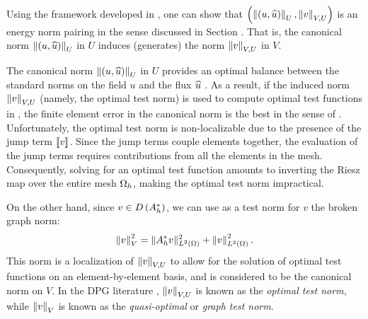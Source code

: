 
Using the framework developed in \cite{Bui-ThanhDemkowiczGhattas11a}, one can show that $\LRp{\nor{\LRp{u,\uh}}_U,  \nor{v}_{V,U}}$ is an energy norm pairing in the sense discussed in Section . That is, the canonical norm $\nor{\LRp{u,\uh}}_U$ in $U$ induces (generates) the norm $\nor{v}_{V,U}$ in $V$.  

The canonical norm $\nor{\LRp{u,\uh}}_U$ in $U$ provides an optimal balance between the standard norms on the field $u$ and the flux $\uh$ \cite{DPG4}. As a result, if the induced norm $\nor{v}_{V,U}$ (namely, the optimal test norm) is used to compute  optimal test functions in , the finite element error in the canonical norm is the best in the sense of . Unfortunately, the optimal test norm is non-localizable due to the presence of the jump term $\jump{v}$. Since the jump terms couple elements together, the evaluation of the jump terms requires contributions from all the elements in the mesh. Consequently, solving for an optimal test function amounts to inverting the Riesz map over the entire mesh $\Oh$, making the optimal test norm impractical.

On the other hand, since $v \in D\LRp{A^*_h}$, we can use as a test norm for $v$ the broken graph norm: 
\[
\nor{v}_V^2 =  \|A_h^*v\|_{\L}^2 + \nor{v}_{\L}^2.
\]
This norm is a localization of $\nor{v}_{V,U}$ to allow for the solution of optimal test functions on an element-by-element basis, and is considered to be the canonical norm on $V$.  In the DPG literature \cite{DPG4}, $\nor{v}_{V,U}$ is known as the {\em optimal test norm}, while $\nor{v}_{V}$ is known as the {\em quasi-optimal} or {\em graph test norm}.


